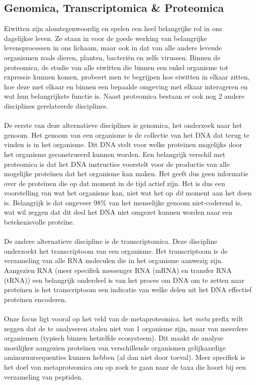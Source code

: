 \documentclass[11pt,dutch,faculty=we,layout=titlefont,underline=false,titleUppercase=true,titleUnderline=true]{ugent2016-report}
\begin{document}
    \subsection{Genomica, Transcriptomica \& Proteomica}\label{subsec:genomica-transcriptomica-&-proteomica}
    Eiwitten zijn alomtegenwoordig en spelen een heel belangrijke rol in ons dagelijkse leven.
    Ze staan in voor de goede werking van belangrijke levensprocessen in ons lichaam, maar ook in dat van alle andere levende organismen zoals dieren, planten, bacteriën en zelfs virussen.
    Binnen de proteomica, de studie van alle eiwitten die binnen een enkel organisme tot expressie kunnen komen, probeert men te begrijpen hoe eiwitten in elkaar zitten, hoe deze met elkaar en binnen een bepaalde omgeving met elkaar interageren en wat hun belangrijkste functie is.
    Naast proteomica bestaan er ook nog 2 andere disciplines gerelateerde disciplines.
    \\ \\
    De eerste van deze alternatieve disciplines is genomica, het onderzoek naar het genoom.
    Het genoom van een organisme is de collectie van het DNA dat terug te vinden is in het organisme.
    Dit DNA stelt voor welke proteïnen mogelijks door het organisme geconstrueerd kunnen worden.
    Een belangrijk verschil met proteomica is dat het DNA instructies voorstelt voor de productie van alle mogelijke proteïnen dat het organisme kan maken.
    Het geeft dus geen informatie over de proteïnen die op dat moment in de tijd actief zijn.
    Het is dus een voorstelling van wat het organisme kan, niet wat het op \textit{dit} moment aan het doen is.
    Belangrijk is dat ongeveer 98\% van het menselijke genoom niet-coderend is, wat wil zeggen dat dit deel het DNA niet omgezet kunnen worden naar een betekenisvolle proteïne.
    \\ \\
    De andere alternatieve discipline is de transcriptomica.
    Deze discipline onderzoekt het transcriptoom van een organisme.
    Het transcriptoom is de verzameling van alle RNA moleculen die in het organisme aanwezig zijn.
    Aangezien RNA (meer specifiek messenger RNA (mRNA) en transfer RNA (tRNA)) een belangrijk onderdeel is van het proces om DNA om te zetten naar proteïnen is het transcriptoom een indicatie van welke delen uit het DNA effectief proteïnen encoderen.
    \\ \\
    Onze focus ligt vooral op het veld van de metaproteomica.
    het \textit{meta} prefix wilt zeggen dat de te analyseren stalen niet van 1 organisme zijn, maar van meerdere organismen (typisch binnen hetzelfde ecosysteem).
    Dit maakt de analyse moeilijker aangezien proteïnen van verschillende organismen gelijkaardige aminozuursequenties kunnen hebben (al dan niet door toeval).
    Meer specifiek is het doel van metaproteomica om op zoek te gaan naar de taxa die hoort bij een verzameling van peptiden.
\end{document}
